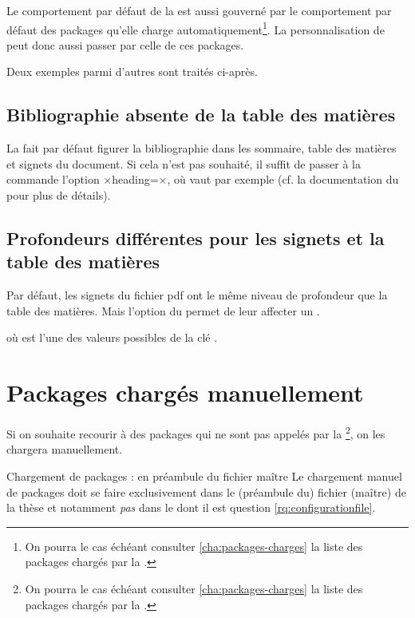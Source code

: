 Le comportement par défaut de la \yatcl{} est aussi gouverné par le
comportement par défaut des packages qu'elle charge
automatiquement\footnote{ On pourra le cas échéant consulter
  \vref{cha:packages-charges} la liste des packages chargés par la \yatcl{}.}.
La personnalisation de \yat{} peut donc aussi passer par celle de ces packages.

Deux exemples parmi d'autres sont traités ci-après.

\subsection{Bibliographie absente de la table des matières}

La \yatcl{} fait par défaut figurer la bibliographie dans les sommaire, table
des matières et signets du document. Si cela n'est pas souhaité, il suffit de
passer à la commande  l'option
×heading=×, où  vaut par exemple
 (cf. la documentation du  pour plus
de détails).

\subsection{Profondeurs différentes pour les signets et la table des matières}

Par défaut, les signets du fichier \acrshort{pdf} ont le même niveau de
profondeur que la table des matières. Mais l'option 
du  permet de leur affecter un .
\begin{preamblecode}[title=Par exemple dans le \File{\configurationfile}]
\end{preamblecode}
où  est l'une des valeurs possibles de la clé
.

\section{Packages chargés manuellement}
\label{sec:options-de-classes}
Si on souhaite recourir à des packages qui ne sont pas appelés par la
\yatcl{}\footnote{On pourra le cas échéant consulter
  \vref{cha:packages-charges} la liste des packages chargés par la \yatcl{}.},
on les chargera manuellement.

\begin{dbwarning}{Chargement de packages : en préambule du fichier maître}{}
  Le chargement manuel de packages doit se faire exclusivement dans le
  (préambule du) fichier (maître) de la thèse et notamment \emph{pas} dans le
  \File{\configurationfile} dont il est question
  \vref{rq:configurationfile}.
\end{dbwarning}

%
\iffalse
\fi
